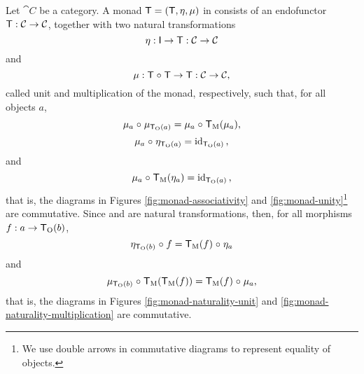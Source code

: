 \begin{definition}
  \label{def:monad}


  Let $\cat{C}$ be a category. A monad $\mathsf{T} = (\mathsf{T},
  \eta, \mu)$ in  consists of an endofunctor
  $\mathsf{T}: \mathcal{C} \to \mathcal{C}$, together with two natural
  transformations
  \begin{equation}
    \label{eq:monad-unit}
    \eta: \mathsf{I} \to \mathsf{T}: \mathcal{C} \to \mathcal{C}
  \end{equation}
  and
  \begin{equation}
    \label{eq:monad-multiplication}
    \mu: \mathsf{T \mathrel{\circ} T} \to \mathsf{T}: \mathcal{C} \to \mathcal{C}
    \text{,}
  \end{equation}
  called unit and multiplication of the monad, respectively, such
  that, for all objects $a$,
  \begin{equation}
    \label{eq:monad-associativity}
    \mu_{a} \mathrel{\circ} \mu_{\mathsf{T}_{\operatorname{O}}(a)} = \mu_{a} \mathrel{\circ} \mathsf{T}_{\operatorname{M}}(\mu_{a})
    \text{,}
  \end{equation}
  \begin{equation}
    \label{eq:monad-unity-left}
    \mu_{a} \mathrel{\circ} \eta_{\mathsf{T}_{\operatorname{O}}(a)} = \operatorname{id}_{\mathsf{T}_{\operatorname{O}}(a)}
    \text{,}
  \end{equation}
  and
  \begin{equation}
    \label{eq:monad-unity-right}
    \mu_{a} \mathrel{\circ} \mathsf{T}_{\operatorname{M}}(\eta_{a}) = \operatorname{id}_{\mathsf{T}_{\operatorname{O}}(a)}
    \text{,}
  \end{equation}
  that is, the diagrams in Figures \ref{fig:monad-associativity} and
  \ref{fig:monad-unity}\footnote{We use double arrows in commutative
    diagrams to represent equality of objects.} are commutative. Since
  \nat{\eta} and \nat{\mu} are natural transformations, then, for all
  morphisms $f: a \to \mathsf{T}_{\operatorname{O}}(b)$,
  \begin{equation}
    \label{eq:monad-naturality-unit}
    \eta_{\mathsf{T}_{\operatorname{O}}(b)} \mathrel{\circ} f = \mathsf{T}_{\operatorname{M}}(f) \mathrel{\circ} \eta_{a}
  \end{equation}
  and
  \begin{equation}
    \label{eq:monad-naturality-multiplication}
    \mu_{\mathsf{T}_{\operatorname{O}}(b)} \mathrel{\circ} \mathsf{T}_{\operatorname{M}}(\mathsf{T}_{\operatorname{M}}(f)) = \mathsf{T}_{\operatorname{M}}(f) \mathrel{\circ} \mu_{a}
    \text{,}
  \end{equation}
  that is, the diagrams in Figures \ref{fig:monad-naturality-unit} and
  \ref{fig:monad-naturality-multiplication} are commutative.


\end{definition}
